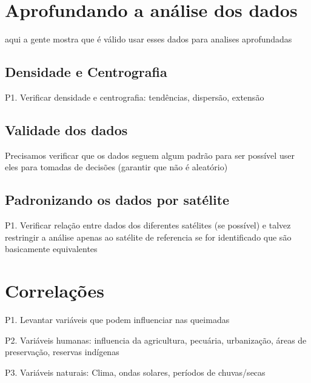 \documentclass[cic,tc]{iiufrgs}
\begin{document}
\chapter{Aprofundando a análise dos dados}

aqui a gente mostra que é válido usar esses dados para analises aprofundadas

\section{Densidade e Centrografia}

P1. Verificar densidade e centrografia: tendências, dispersão, extensão \par

\section{Validade dos dados}

Precisamos verificar que os dados seguem algum padrão para ser possível
user eles para tomadas de decisões (garantir que não é aleatório) 
\cite[Point Pattern Analysis]{geographicDataSciencePython} \par

\section{Padronizando os dados por satélite}

P1. Verificar relação entre dados dos diferentes satélites (se possível) e talvez restringir a análise apenas ao satélite de referencia se for identificado que são basicamente equivalentes \par

\chapter{Correlações}

P1. Levantar variáveis que podem influenciar nas queimadas \par
P2. Variáveis humanas: influencia da agricultura, pecuária, 
urbanização, áreas de preservação, reservas indígenas \par
P3. Variáveis naturais: Clima, ondas solares, períodos de chuvas/secas \par





\end{document}
